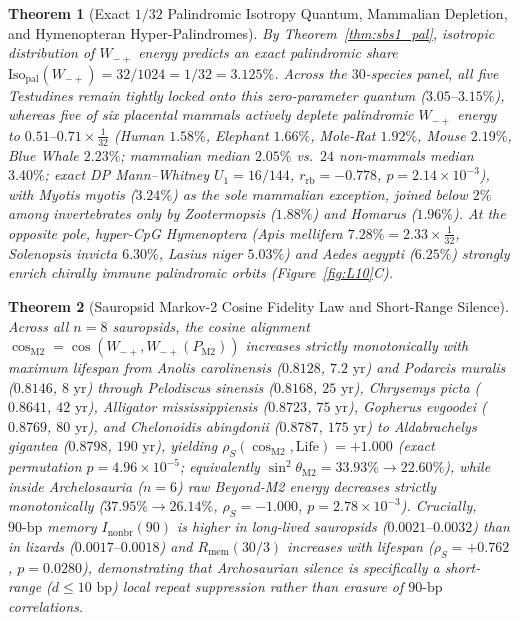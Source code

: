 \documentclass[11pt,a4paper]{article}
\renewcommand{\_}{\origunderscore\penalty200\relax}
\newtheorem{theorem}{Theorem}[section]
\theoremstyle{remark}
\begin{document}
\begin{theorem}[Exact $1/32$ Palindromic Isotropy Quantum, Mammalian Depletion, and Hymenopteran Hyper-Palindromes]
\label{thm:L8c}
By Theorem~\ref{thm:sbs1_pal}, isotropic distribution of $W_{-+}$ energy predicts an exact palindromic share $\mathrm{Iso}_{\mathrm{pal}}(W_{-+}) = 32/1024 = 1/32 = 3.125\%$. Across the $30$-species panel, all five Testudines remain tightly locked onto this zero-parameter quantum ($3.05\text{--}3.15\%$), whereas five of six placental mammals actively deplete palindromic $W_{-+}$ energy to $0.51\text{--}0.71\times\frac{1}{32}$ (Human $1.58\%$, Elephant $1.66\%$, Mole-Rat $1.92\%$, Mouse $2.19\%$, Blue Whale $2.23\%$; mammalian median $2.05\%$ vs.\ $24$ non-mammals median $3.40\%$; exact DP Mann--Whitney $U_1 = 16/144$, $r_{\mathrm{rb}} = -0.778$, $p = 2.14 \times 10^{-3}$), with \textit{Myotis myotis} ($3.24\%$) as the sole mammalian exception, joined below $2\%$ among invertebrates only by \textit{Zootermopsis} ($1.88\%$) and \textit{Homarus} ($1.96\%$). At the opposite pole, hyper-CpG Hymenoptera (\textit{Apis mellifera} $7.28\% = 2.33\times\frac{1}{32}$, \textit{Solenopsis invicta} $6.30\%$, \textit{Lasius niger} $5.03\%$) and \textit{Aedes aegypti} ($6.25\%$) strongly enrich chirally immune palindromic orbits (Figure~\ref{fig:L10}C).
\end{theorem}

\begin{theorem}[Sauropsid Markov-2 Cosine Fidelity Law and Short-Range Silence]
\label{thm:L8d}
Across all $n=8$ sauropsids, the cosine alignment $\cos_{\mathrm{M2}} = \cos(W_{-+}, W_{-+}(P_{\mathrm{M2}}))$ increases strictly monotonically with maximum lifespan from \textit{Anolis carolinensis} ($0.8128$, $7.2\text{ yr}$) and \textit{Podarcis muralis} ($0.8146$, $8\text{ yr}$) through \textit{Pelodiscus sinensis} ($0.8168$, $25\text{ yr}$), \textit{Chrysemys picta} ($0.8641$, $42\text{ yr}$), \textit{Alligator mississippiensis} ($0.8723$, $75\text{ yr}$), \textit{Gopherus evgoodei} ($0.8769$, $80\text{ yr}$), and \textit{Chelonoidis abingdonii} ($0.8787$, $175\text{ yr}$) to \textit{Aldabrachelys gigantea} ($0.8798$, $190\text{ yr}$), yielding $\rho_S(\cos_{\mathrm{M2}}, \text{Life}) = +1.000$ (exact permutation $p = 4.96 \times 10^{-5}$; equivalently $\sin^2\theta_{\mathrm{M2}} = 33.93\% \to 22.60\%$), while inside Archelosauria ($n=6$) raw Beyond-M2 energy decreases strictly monotonically ($37.95\% \to 26.14\%$, $\rho_S = -1.000$, $p = 2.78 \times 10^{-3}$). Crucially, $90\text{-bp}$ memory $I_{\mathrm{nonbr}}(90)$ is higher in long-lived sauropsids ($0.0021\text{--}0.0032$) than in lizards ($0.0017\text{--}0.0018$) and $R_{\mathrm{mem}}(30/3)$ increases with lifespan ($\rho_S = +0.762$, $p = 0.0280$), demonstrating that Archosaurian silence is specifically a short-range ($d \le 10\text{ bp}$) local repeat suppression rather than erasure of $90\text{-bp}$ correlations.
\end{theorem}
\end{document}
